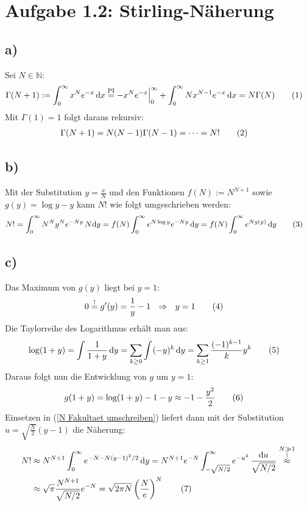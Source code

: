 \documentclass[a4paper,12pt]{article}
\newcommand\numberthis{\addtocounter{equation}{1}\tag{\theequation}}
\newcommand{\kom}{}
\newcommand{\intx}{}
\newcommand{\kla}{}
\newcommand{\tecxt}{}
\begin{document}
\section*{Aufgabe 1.2: Stirling-Näherung}
\subsection*{a)} Sei $N\in\mathbb{N}$:
\begin{align*}
\Gamma(N+1)&:=\intx\int_{0}^{\infty}x^Ne^{-x}\,\mathrm{d}x\overset{\tecxt\text{PI}}{=}-x^Ne^{-x}\Big\vert_0^\infty+\intx\int_{0}^{\infty}Nx^{N-1}e^{-x}\,\mathrm{d}x=N\Gamma(N)\numberthis\label{Gamma Rekursion}
\end{align*}
Mit $\Gamma(1)=1$ folgt daraus rekursiv:
\begin{align*}
\Gamma(N+1)&=N(N-1)\Gamma(N-1)=\dots=N!\numberthis\label{Gamma ist Fakultaet}
\end{align*}
\subsection*{b)}
Mit der Substitution $y=\frac{x}{N}$ und den Funktionen $f(N):=N^{N+1}$ sowie $g(y)=\log y-y$ kann $N!$ wie folgt umgeschrieben werden:
\begin{align*}
N!&=\intx\int_{0}^{\infty}N^Ny^Ne^{-Ny}\,N\mathrm{d}y=f(N)\intx\int_{0}^{\infty}e^{N\log y}e^{-Ny}\,\mathrm{d}y=f(N)\intx\int_{0}^{\infty}e^{Ng(y)}\,\mathrm{d}y\numberthis\label{N Fakultaet umschreiben}
\end{align*}
\subsection*{c)}
Das Maximum von $g(y)$ liegt bei $y=1$:
\begin{align*}
0&\overset{!}{=}g'(y)=\frac{1}{y}-1\ \ \Rightarrow\ \ y=1\numberthis\label{Maximum von g}
\end{align*}
Die Taylorreihe des Logarithmus erhält man aus:
\begin{align*}
\log(1+y)&=\int\frac{1}{1+y}\,\mathrm{d}y=\sum_{k\ge 0}\intx\int_{ }^{ }(-y)^k\,\mathrm{d}y=\sum_{k\ge 1}\frac{(-1)^{k-1}}{k}y^k\numberthis\label{Potenzreihe log}
\end{align*}
Daraus folgt nun die Entwicklung von $g$ um $y=1$:
\begin{align*}
g(1+y)&=\log(1+y)-1-y\approx -1-\frac{y^2}{2}\numberthis\label{Naeherung g um 1}
\end{align*}
Einsetzen in (\ref{N Fakultaet umschreiben}) liefert dann mit der Substitution $u=\sqrt{\frac{N}{2}}(y-1)$ die Näherung:
\begin{align*}
N!&\approx N^{N+1}\intx\int_{0}^{\infty}e^{-N-N(y-1)^2/2}\,\mathrm{d}y=N^{N+1}e^{-N}\intx\int_{-\sqrt{N/2}}^{\infty}e^{-u^2}\,\frac{\mathrm{d}u}{\sqrt{N/2}}\kom\overset{\substack{{N\gg 1} \\ |}}{\approx}\\
&\approx\sqrt{\pi}\frac{N^{N+1}}{\sqrt{N/2}}e^{-N}=\sqrt{2\pi N}\kla\left( {\frac{N}{e}} \right)^N\numberthis\label{Stirling Formel}
\end{align*}
\end{document}
